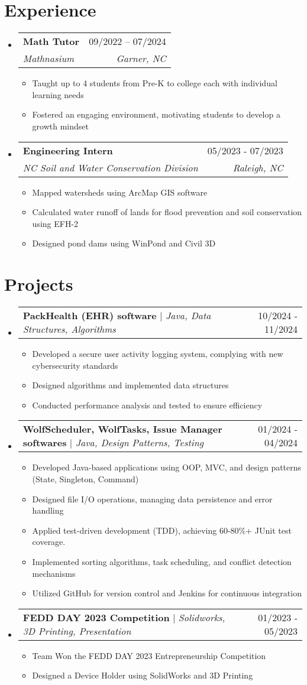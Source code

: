 \documentclass[letterpaper,11pt]{article}
\makeatletter
\newcommand{\resumeItem}[1]{
  \item\small{
    {#1 \vspace{-2pt}}
  }
}
\newcommand{\resumeSubheading}[4]{
  \vspace{-2pt}\item
    \begin{tabular*}{0.97\textwidth}[t]{l@{\extracolsep{\fill}}r}
      \textbf{#1} & #2 \\
      \textit{\small#3} & \textit{\small #4} \\
    \end{tabular*}\vspace{-7pt}
}
\newcommand{\resumeProjectHeading}[2]{
    \item
    \begin{tabular*}{0.97\textwidth}{l@{\extracolsep{\fill}}r}
      \small#1 & #2 \\
    \end{tabular*}\vspace{-7pt}
}
\newcommand{\resumeSubHeadingListStart}{\begin{itemize}[leftmargin=0.15in, label={}]}
\newcommand{\resumeSubHeadingListEnd}{\end{itemize}}
\newcommand{\resumeItemListStart}{\begin{itemize}}
\newcommand{\resumeItemListEnd}{\end{itemize}\vspace{-5pt}}
\makeatother
\begin{document}
\section{Experience}
  \resumeSubHeadingListStart
    \resumeSubheading
      {Math Tutor}{09/2022 – 07/2024}
      {Mathnasium}{Garner, NC}
      \resumeItemListStart
        \resumeItem{Taught up to 4 students from Pre-K to college each with individual learning needs}
        \resumeItem{Fostered an engaging environment, motivating students to develop a growth mindset}
    \resumeItemListEnd

    \resumeSubheading
      {Engineering Intern}{05/2023 - 07/2023}
      {NC Soil and Water Conservation Division}{Raleigh, NC}
      \resumeItemListStart
        \resumeItem{Mapped watersheds using ArcMap GIS software}
        \resumeItem{Calculated water runoff of lands for flood prevention and soil conservation using EFH-2}
        \resumeItem{Designed pond dams using WinPond and Civil 3D}
      \resumeItemListEnd

  \resumeSubHeadingListEnd

  
\section{Projects}
    \resumeSubHeadingListStart
      \resumeProjectHeading
          {\textbf{PackHealth (EHR) software} $|$ \emph{Java, Data Structures, Algorithms}}{10/2024 - 11/2024}
          \resumeItemListStart
            \resumeItem{Developed a secure user activity logging system, complying with new cybersecurity standards}
            \resumeItem{Designed algorithms and implemented data structures}
            \resumeItem{Conducted performance analysis and tested to ensure efficiency}
          \resumeItemListEnd
        \resumeProjectHeading
          {\textbf{WolfScheduler, WolfTasks, Issue Manager softwares} $|$ \emph{Java, Design Patterns, Testing}}{01/2024 - 04/2024}
          \resumeItemListStart
            \resumeItem{Developed Java-based applications using OOP, MVC, and design patterns (State, Singleton, Command)}
            \resumeItem{Designed file I/O operations, managing data persistence and error handling}
            \resumeItem{Applied test-driven development (TDD), achieving 60-80\%+ JUnit test coverage.}
            \resumeItem{Implemented sorting algorithms, task scheduling, and conflict detection mechanisms}
            \resumeItem{Utilized GitHub for version control and Jenkins for continuous integration}
          \resumeItemListEnd
      \resumeProjectHeading
          {\textbf{FEDD DAY 2023 Competition} $|$ \emph{Solidworks, 3D Printing, Presentation}}{01/2023 - 05/2023}
          \resumeItemListStart
            \resumeItem{Team Won the FEDD DAY 2023 Entrepreneurship Competition}
            \resumeItem{Designed a Device Holder using SolidWorks and 3D Printing}
          \resumeItemListEnd
    \resumeSubHeadingListEnd
\end{document}
